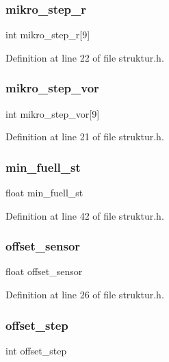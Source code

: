 \subsubsection{mikro\+\_\+step\+\_\+r}
{\footnotesize\ttfamily int mikro\+\_\+step\+\_\+r[9]}



Definition at line 22 of file struktur.\+h.

\mbox{\label{structramp1_a6e08fa977829514e1b37a8e190cd7e00}} 
\subsubsection{mikro\+\_\+step\+\_\+vor}
{\footnotesize\ttfamily int mikro\+\_\+step\+\_\+vor[9]}



Definition at line 21 of file struktur.\+h.

\mbox{\label{structramp1_a6c0a0fff0113131ead38829fe28077e8}} 
\subsubsection{min\+\_\+fuell\+\_\+st}
{\footnotesize\ttfamily float min\+\_\+fuell\+\_\+st}



Definition at line 42 of file struktur.\+h.

\mbox{\label{structramp1_a11fc3d95e70cc6d7382c33f425342091}} 
\subsubsection{offset\+\_\+sensor}
{\footnotesize\ttfamily float offset\+\_\+sensor}



Definition at line 26 of file struktur.\+h.

\mbox{\label{structramp1_a730f588d76a6c565f843186010ebcddb}} 
\subsubsection{offset\+\_\+step}
{\footnotesize\ttfamily int offset\+\_\+step}



